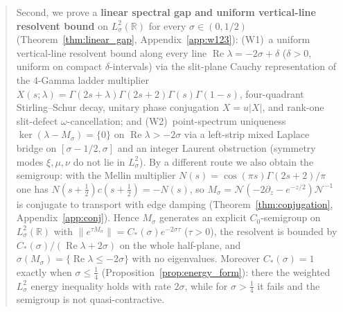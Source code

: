\documentclass[11pt,a4paper]{article}
\begin{document}
\begin{abstract}
Second, we prove a \textbf{linear spectral gap and uniform vertical-line resolvent bound} on
$L^2_\sigma(\mathbb{R})$ for every $\sigma\in(0,1/2)$ (Theorem~\ref{thm:linear_gap},
Appendix~\ref{app:w123}): (W1)~a uniform vertical-line resolvent bound along every line
$\operatorname{Re}\lambda = -2\sigma+\delta$ ($\delta>0$, uniform on compact $\delta$-intervals) via the slit-plane Cauchy representation of the
4-Gamma ladder multiplier $X(s;\lambda)=\Gamma(2s+\lambda)\Gamma(2s+2)\Gamma(s)\Gamma(1-s)$,
four-quadrant Stirling--Schur decay, unitary phase conjugation $X=u|X|$, and rank-one slit-defect
$\omega$-cancellation; and (W2)~point-spectrum uniqueness $\ker(\lambda-M_\sigma)=\{0\}$ on
$\operatorname{Re}\lambda>-2\sigma$ via a left-strip mixed Laplace bridge on $[\sigma-1/2,\sigma]$
and an integer Laurent obstruction (symmetry modes $\xi,\mu,\nu$ do not lie in $L^2_\sigma$).
By a different route we also obtain the semigroup: with the Mellin multiplier
$N(s)=\cos(\pi s)\Gamma(2s+2)/\pi$ one has $N(s+\tfrac12)c(s+\tfrac12)=-N(s)$, so
$M_\sigma=\mathcal{N}(-2\partial_z-e^{-z/2})\mathcal{N}^{-1}$ is conjugate to transport with edge damping
(Theorem~\ref{thm:conjugation}, Appendix~\ref{app:conj}).  Hence $M_\sigma$ generates an explicit
$C_0$-semigroup on $L^2_\sigma(\mathbb{R})$ with $\|e^{\tau M_\sigma}\|=C_*(\sigma)e^{-2\sigma\tau}$
($\tau>0$), the resolvent is bounded by $C_*(\sigma)/(\operatorname{Re}\lambda+2\sigma)$ on the whole
half-plane, and $\sigma(M_\sigma)=\{\operatorname{Re}\lambda\le-2\sigma\}$ with no eigenvalues.
Moreover $C_*(\sigma)=1$ exactly when $\sigma\le\tfrac14$ (Proposition~\ref{prop:energy_form}): there the weighted $L^2_\sigma$
energy inequality holds with rate $2\sigma$, while for $\sigma>\tfrac14$ it fails and the semigroup is not quasi-contractive.


\end{abstract}
\end{document}
